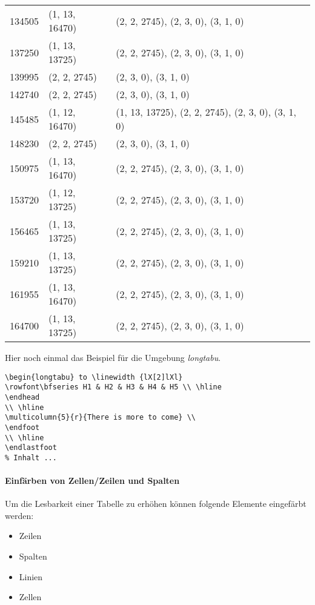 \begin{center}
\begin{longtable}{|l|l|l|}
		134505 & (1, 13, 16470) & (2, 2, 2745), (2, 3, 0), (3, 1, 0) \\
		137250 & (1, 13, 13725) & (2, 2, 2745), (2, 3, 0), (3, 1, 0) \\
		139995 & (2, 2, 2745) & (2, 3, 0), (3, 1, 0) \\
		142740 & (2, 2, 2745) & (2, 3, 0), (3, 1, 0) \\
		145485 & (1, 12, 16470) & (1, 13, 13725), (2, 2, 2745), (2, 3, 0), (3, 1, 0) \\
		148230 & (2, 2, 2745) & (2, 3, 0), (3, 1, 0) \\
		150975 & (1, 13, 16470) & (2, 2, 2745), (2, 3, 0), (3, 1, 0) \\
		153720 & (1, 12, 13725) & (2, 2, 2745), (2, 3, 0), (3, 1, 0) \\
		156465 & (1, 13, 13725) & (2, 2, 2745), (2, 3, 0), (3, 1, 0) \\
		159210 & (1, 13, 13725) & (2, 2, 2745), (2, 3, 0), (3, 1, 0) \\
		161955 & (1, 13, 16470) & (2, 2, 2745), (2, 3, 0), (3, 1, 0) \\
		164700 & (1, 13, 13725) & (2, 2, 2745), (2, 3, 0), (3, 1, 0) \\
	\end{longtable}
\end{center}

Hier noch einmal das Beispiel für die Umgebung \emph{longtabu}.
\begin{lstlisting}[style=LaTeX,caption={Beispiel zur Umgebung: LongTabu},label=lst:tab5]
\begin{longtabu} to \linewidth {lX[2]lXl}
\rowfont\bfseries H1 & H2 & H3 & H4 & H5 \\ \hline 
\endhead
\\ \hline
\multicolumn{5}{r}{There is more to come} \\
\endfoot
\\ \hline
\endlastfoot
% Inhalt ...
\end{lstlisting}


\paragraph{Einfärben von Zellen/Zeilen und Spalten}

Um die Lesbarkeit einer Tabelle zu erhöhen können folgende Elemente eingefärbt werden: 
\begin{itemize}
	\item Zeilen
	\item Spalten
	\item Linien
	\item Zellen
\end{itemize}

